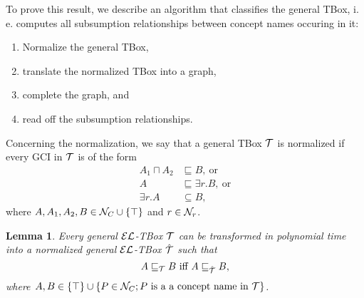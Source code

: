 \documentclass[openany]{scrbook}
\theoremstyle{break}
\newtheorem{Lemma}[Theorem]{Lemma}
\theoremstyle{nonumberbreak}
\theoremstyle{nonumberplain}
\theoremstyle{nonumberbreak}
\newcommand{\set}[1]{\left\{#1\right\}}
\newcommand{\ie}{i{.}\,e{.}\xspace}
\newcommand{\EL}{{\cal E}{\cal L}}
\begin{document}
To prove this result, we describe an algorithm that classifies the
general TBox, \ie computes all subsumption relationships between
concept names occuring in it:
\begin{enumerate}
\item Normalize the general TBox,
\item translate the normalized TBox into a graph,
\item complete the graph, and
\item read off the subsumption relationships.
\end{enumerate}

Concerning the normalization, we say that a general TBox ${\cal T}$ is
normalized if every GCI in ${\cal T}$ is of the form
\begin{align*}
  A_1 \sqcap A_2 & \sqsubseteq B,\ \text{or} \\
  A & \sqsubseteq \exists r.B,\ \text{or} \\
  \exists r.A & \subseteq B,
\end{align*}
where $A, A_1, A_2, B \in {\cal N}_C \cup \set{\top}$ and $r \in
{\cal N}_r$.

\begin{Lemma}
  \label{5.15}
  Every general $\EL$-TBox ${\cal T}$ can be transformed in polynomial
  time into a normalized general $\EL$-TBox $\hat{{\cal T}}$ such that
  \begin{equation}
    \label{eq:5.15}
    A \sqsubseteq_{\cal T} B\ \text{iff}\ A \sqsubseteq_{\hat{\cal T}} B,
  \end{equation}
  where $A, B \in \set{\top} \cup \set{P \in {\cal N}_C; P\ \text{is a
      a concept name in}\ {\cal T}}$.
\end{Lemma}
\end{document}
